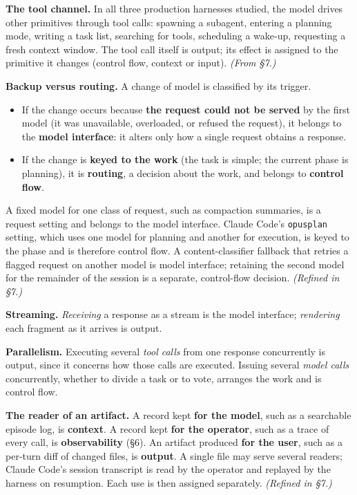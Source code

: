 \textbf{The tool channel.} In all three production harnesses studied, the model drives other primitives through tool calls: spawning a subagent, entering a planning mode, writing a task list, searching for tools, scheduling a wake-up, requesting a fresh context window. The tool call itself is output; its effect is assigned to the primitive it changes (control flow, context or input). \emph{(From §7.)}

\textbf{Backup versus routing.} A change of model is classified by its trigger.

\begin{itemize}
\tightlist
\item
  If the change occurs because \textbf{the request could not be served} by the first model (it was unavailable, overloaded, or refused the request), it belongs to the \textbf{model interface}: it alters only how a single request obtains a response.
\item
  If the change is \textbf{keyed to the work} (the task is simple; the current phase is planning), it is \textbf{routing}, a decision about the work, and belongs to \textbf{control flow}.
\end{itemize}

A fixed model for one class of request, such as compaction summaries, is a request setting and belongs to the model interface. Claude Code's \passthrough{\lstinline!opusplan!} setting, which uses one model for planning and another for execution, is keyed to the phase and is therefore control flow. A content-classifier fallback that retries a flagged request on another model is model interface; retaining the second model for the remainder of the session is a separate, control-flow decision. \emph{(Refined in §7.)}

\textbf{Streaming.} \emph{Receiving} a response as a stream is the model interface; \emph{rendering} each fragment as it arrives is output.

\textbf{Parallelism.} Executing several \emph{tool calls} from one response concurrently is output, since it concerns how those calls are executed. Issuing several \emph{model calls} concurrently, whether to divide a task or to vote, arranges the work and is control flow.

\textbf{The reader of an artifact.} A record kept \textbf{for the model}, such as a searchable episode log, is \textbf{context}. A record kept \textbf{for the operator}, such as a trace of every call, is \textbf{observability} (§6). An artifact produced \textbf{for the user}, such as a per-turn diff of changed files, is \textbf{output}. A single file may serve several readers; Claude Code's session transcript is read by the operator and replayed by the harness on resumption. Each use is then assigned separately. \emph{(Refined in §7.)}

